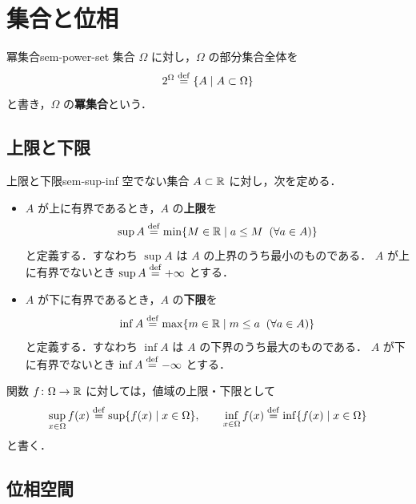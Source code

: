 \chapter{集合と位相}
\label{ch:found-set-topology}

\begin{definition}{冪集合}{sem-power-set}
  集合 $\Omega$ に対し，$\Omega$ の部分集合全体を
  \[
    2^{\Omega} \overset{\mathrm{def}}{=} \{A \mid A \subset \Omega\}
  \]
  と書き，$\Omega$ の\textbf{冪集合}という．
\end{definition}

\section{上限と下限}
\label{sec:sem-sup-inf}

\begin{definition}{上限と下限}{sem-sup-inf}
  空でない集合 $A \subset \mathbb{R}$ に対し，次を定める．
  \begin{itemize}
    \item $A$ が上に有界であるとき，$A$ の\textbf{上限}を
      \[
        \sup A \overset{\mathrm{def}}{=} \min\{M \in \mathbb{R} \mid a \leq M \;\; (\forall a \in A)\}
      \]
      と定義する．すなわち $\sup A$ は $A$ の上界のうち最小のものである．
      $A$ が上に有界でないとき $\sup A \overset{\mathrm{def}}{=} +\infty$ とする．
    \item $A$ が下に有界であるとき，$A$ の\textbf{下限}を
      \[
        \inf A \overset{\mathrm{def}}{=} \max\{m \in \mathbb{R} \mid m \leq a \;\; (\forall a \in A)\}
      \]
      と定義する．すなわち $\inf A$ は $A$ の下界のうち最大のものである．
      $A$ が下に有界でないとき $\inf A \overset{\mathrm{def}}{=} -\infty$ とする．
  \end{itemize}
  関数 $f \colon \Omega \to \mathbb{R}$ に対しては，値域の上限・下限として
  \[
    \sup_{x \in \Omega} f(x) \overset{\mathrm{def}}{=} \sup\{f(x) \mid x \in \Omega\},
    \qquad
    \inf_{x \in \Omega} f(x) \overset{\mathrm{def}}{=} \inf\{f(x) \mid x \in \Omega\}
  \]
  と書く．
\end{definition}

\section{位相空間}
\label{sec:sem-topology}

